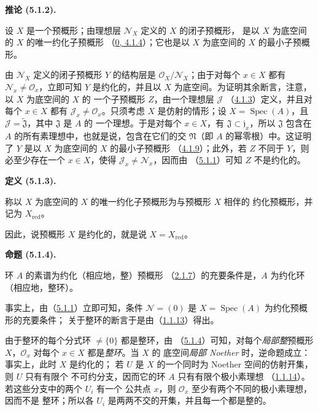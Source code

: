 \documentclass[UTF8,fontset=none,11pt,oneside,openany]{ctexbook}
\newenvironment{definition}[1][]{%
  \par\medskip\noindent\textbf{定义 (#1).}\ %
}{\par}
\newenvironment{proposition}[1][]{%
  \par\medskip\noindent\textbf{命题 (#1).}\ %
}{\par}
\newenvironment{corollary}[1][]{%
  \par\medskip\noindent\textbf{推论 (#1).}\ %
}{\par}
\let\EGAOriginalLabel\label
\renewcommand{\label}[1]{\phantomsection\EGAOriginalLabel{#1}}
\begin{document}
\begin{corollary}[5.1.2]
\label{I.5.1.2-fr}
设 $X$ 是一个预概形；由理想层 $\mathscr{N}_X$ 定义的 $X$ 的闭子预概形，
是以 $X$ 为底空间的 $X$ 的唯一约化子预概形
（\hyperref[0.4.1.4-fr]{0, 4.1.4}）；它也是以 $X$ 为底空间的 $X$ 的最小子预概形。
\end{corollary}

由 $\mathscr{N}_X$ 定义的闭子预概形 $Y$ 的结构层是
$\mathscr{O}_X/\mathscr{N}_X$；由于对每个 $x\in X$ 都有
$\mathscr{N}_x\ne\mathscr{O}_x$，立即可知 $Y$ 是约化的，并且以
$X$ 为底空间。为证明其余断言，注意，以 $X$ 为底空间的 $X$ 的
一个子预概形 $Z$，由一个理想层 $\mathscr{J}$
（\hyperref[I.4.1.3-fr]{4.1.3}）定义，并且对每个 $x\in X$ 都有
$\mathscr{J}_x\ne\mathscr{O}_x$。只须考虑 $X$ 是仿射的情形；设
$X=\operatorname{Spec}(A)$，且
$\mathscr{J}=\widetilde{\mathfrak{J}}$，其中 $\mathfrak{J}$ 是 $A$ 的
一个理想。于是对每个 $x\in X$，有
$\mathfrak{J}\subset\mathfrak{j}_x$，所以 $\mathfrak{J}$ 包含在
$A$ 的所有素理想中，也就是说，包含在它们的交 $\mathfrak{N}$（即 $A$
的幂零根）中。这证明了 $Y$ 是以 $X$ 为底空间的 $X$ 的最小子预概形
（\hyperref[I.4.1.9-fr]{4.1.9}）；此外，若 $Z$ 不同于
$Y$，则必至少存在一个 $x\in X$，使得
$\mathscr{J}_x\ne\mathscr{N}_x$，因而由
（\hyperref[I.5.1.1-fr]{5.1.1}）可知 $Z$ 不是约化的。

\begin{definition}[5.1.3]
\label{I.5.1.3-fr}
称以 $X$ 为底空间的 $X$ 的唯一约化子预概形为与预概形 $X$ 相伴的
约化预概形，并记为 $X_{\mathrm{red}}$。
\end{definition}

因此，说预概形 $X$ 是约化的，就是说
$X=X_{\mathrm{red}}$。

\begin{proposition}[5.1.4]
\label{I.5.1.4-fr}
环 $A$ 的素谱为约化（相应地，整）预概形
（\hyperref[I.2.1.7-fr]{2.1.7}）的充要条件是，$A$ 为约化环
（相应地，整环）。
\end{proposition}

事实上，由（\hyperref[I.5.1.1-fr]{5.1.1}）立即可知，条件
$\mathscr{N}=(0)$ 是 $X=\operatorname{Spec}(A)$ 为约化预概形的充要条件；
关于整环的断言于是由（\hyperref[I.1.1.13-fr]{1.1.13}）得出。

由于整环的每个分式环 $\ne\{0\}$ 都是整环，由
（\hyperref[I.5.1.4-fr]{5.1.4}）可知，对每个\emph{局部整}预概形
$X$，$\mathscr{O}_x$ 对每个 $x\in X$ 都是\emph{整环}。当 $X$ 的
底空间\emph{局部 Noether} 时，逆命题成立：事实上，此时 $X$ 是约化的；
若 $U$ 是 $X$ 的一个同时为 Noether 空间的仿射开集，则 $U$ 只有有限个
不可约分支，因而它的环 $A$ 只有有限个极小素理想
（\hyperref[I.1.1.14-fr]{1.1.14}）。若这些分支中的两个 $U_i$ 有一个
公共点 $x$，则 $\mathscr{O}_x$ 至少有两个不同的极小素理想，因而不是
整环；所以各 $U_i$ 是两两不交的开集，并且每一个都是整的。
\end{document}
